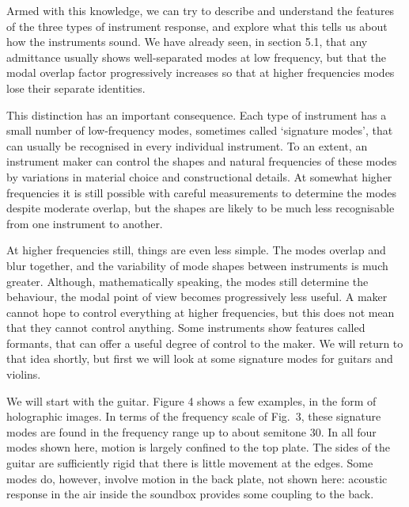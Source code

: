   Armed with this knowledge, we can try to describe and understand the features 
  of the three types of instrument response, and explore what this tells us 
  about how the instruments sound. We have already seen, in section 5.1, that 
  any admittance usually shows well-separated modes at low frequency, but that 
  the modal overlap factor progressively increases so that at higher 
  frequencies modes lose their separate identities. 

  This distinction has an important consequence. Each type of instrument has a 
  small number of low-frequency modes, sometimes called `signature modes', that 
  can usually be recognised in every individual instrument. To an extent, an 
  instrument maker can control the shapes and natural frequencies of these 
  modes by variations in material choice and constructional details. At 
  somewhat higher frequencies it is still possible with careful measurements to 
  determine the modes despite moderate overlap, but the shapes are likely to be 
  much less recognisable from one instrument to another. 

  At higher frequencies still, things are even less simple. The modes overlap 
  and blur together, and the variability of mode shapes between instruments is 
  much greater. Although, mathematically speaking, the modes still determine 
  the behaviour, the modal point of view becomes progressively less useful. A 
  maker cannot hope to control everything at higher frequencies, but this does 
  not mean that they cannot control anything. Some instruments show features 
  called formants, that can offer a useful degree of control to the maker. We 
  will return to that idea shortly, but first we will look at some signature 
  modes for guitars and violins. 

  We will start with the guitar. Figure 4 shows a few examples, in the form of 
  holographic images. In terms of the frequency scale of Fig.\ 3, these 
  signature modes are found in the frequency range up to about semitone 30. In 
  all four modes shown here, motion is largely confined to the top plate. The 
  sides of the guitar are sufficiently rigid that there is little movement at 
  the edges. Some modes do, however, involve motion in the back plate, not 
  shown here: acoustic response in the air inside the soundbox provides some 
  coupling to the back. 




